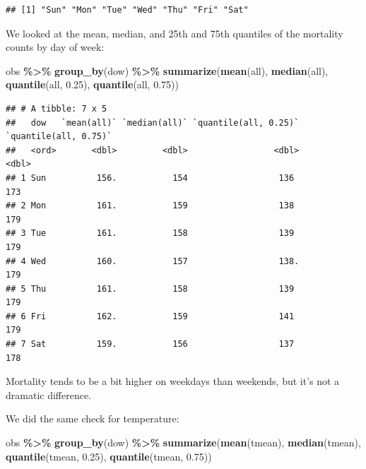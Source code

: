 \documentclass[
]{book}
\newenvironment{Shaded}{\begin{snugshade}}{\end{snugshade}}
\newcommand{\FloatTok}[1]{\textcolor[rgb]{0.00,0.00,0.81}{#1}}
\newcommand{\FunctionTok}[1]{\textcolor[rgb]{0.13,0.29,0.53}{\textbf{#1}}}
\newcommand{\NormalTok}[1]{#1}
\newcommand{\SpecialCharTok}[1]{\textcolor[rgb]{0.81,0.36,0.00}{\textbf{#1}}}
\begin{document}
\begin{verbatim}
## [1] "Sun" "Mon" "Tue" "Wed" "Thu" "Fri" "Sat"
\end{verbatim}

We looked at the mean, median, and 25th and 75th quantiles of the mortality
counts by day of week:

\begin{Shaded}
\begin{Highlighting}[]
\NormalTok{obs }\SpecialCharTok{\%\textgreater{}\%} 
  \FunctionTok{group\_by}\NormalTok{(dow) }\SpecialCharTok{\%\textgreater{}\%} 
  \FunctionTok{summarize}\NormalTok{(}\FunctionTok{mean}\NormalTok{(all), }
            \FunctionTok{median}\NormalTok{(all), }
            \FunctionTok{quantile}\NormalTok{(all, }\FloatTok{0.25}\NormalTok{), }
            \FunctionTok{quantile}\NormalTok{(all, }\FloatTok{0.75}\NormalTok{))}
\end{Highlighting}
\end{Shaded}

\begin{verbatim}
## # A tibble: 7 x 5
##   dow   `mean(all)` `median(all)` `quantile(all, 0.25)` `quantile(all, 0.75)`
##   <ord>       <dbl>         <dbl>                 <dbl>                 <dbl>
## 1 Sun          156.           154                  136                    173
## 2 Mon          161.           159                  138                    179
## 3 Tue          161.           158                  139                    179
## 4 Wed          160.           157                  138.                   179
## 5 Thu          161.           158                  139                    179
## 6 Fri          162.           159                  141                    179
## 7 Sat          159.           156                  137                    178
\end{verbatim}

Mortality tends to be a bit higher on weekdays than weekends, but it's not
a dramatic difference.

We did the same check for temperature:

\begin{Shaded}
\begin{Highlighting}[]
\NormalTok{obs }\SpecialCharTok{\%\textgreater{}\%} 
  \FunctionTok{group\_by}\NormalTok{(dow) }\SpecialCharTok{\%\textgreater{}\%} 
  \FunctionTok{summarize}\NormalTok{(}\FunctionTok{mean}\NormalTok{(tmean), }
            \FunctionTok{median}\NormalTok{(tmean), }
            \FunctionTok{quantile}\NormalTok{(tmean, }\FloatTok{0.25}\NormalTok{), }
            \FunctionTok{quantile}\NormalTok{(tmean, }\FloatTok{0.75}\NormalTok{))}
\end{Highlighting}
\end{Shaded}
\end{document}
